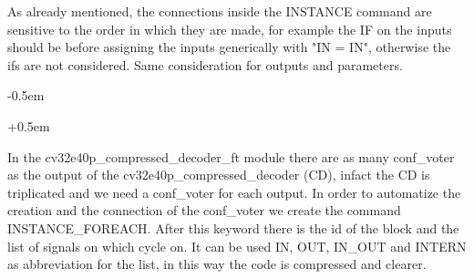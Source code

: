 {{{            As already mentioned, the connections inside the INSTANCE command are sensitive to the order in which they are made, for example the IF on the inputs should be before assigning the inputs generically with "IN = IN", otherwise the ifs are not considered. Same consideration for outputs and parameters. 
        
    		\openup -0.5em
    	
    		\begin{parcolumns}[colwidths={1=0.5\textwidth}, distance=0.5em]{2}
    		\end{parcolumns}
    	
    		\openup +0.5em
    		
        	
        	In the cv32e40p\_compressed\_decoder\_ft module there are as many conf\_voter as the output of the cv32e40p\_compressed\_decoder (CD), infact the CD is triplicated and we need a conf\_voter for each output. In order to automatize the creation and the connection of the conf\_voter we create the command INSTANCE\_FOREACH. After this keyword there is the id of the block and the list of signals on which cycle on. It can be used IN, OUT, IN\_OUT and INTERN as abbreviation for the list, in this way the code is compressed and clearer.
        	
}}}
